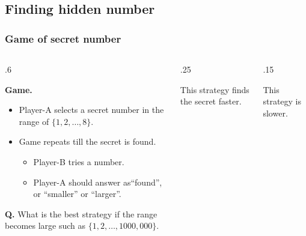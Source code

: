 \documentclass[10pt]{beamer}
\begin{document}
\subsection{Finding hidden number}
\begin{frame}[t,fragile] \frametitle{Game of secret number}
	\begin{columns}[T] %
	\begin{column}{.6\linewidth} %
	
		\textbf{Game.}
		\begin{itemize}
			
			\item 
			Player-A selects a secret number in the range of \( \{ 1, 2, \dotsc, 8 \} \).
	
			\item
			Game repeats till the secret is found.
			
			\begin{itemize}
		
				\item 
				Player-B tries a number.
				
				\item 
				Player-A should answer as``found'', or ``smaller'' or ``larger''.
				
			\end{itemize}		
			
		\end{itemize}
	
		\textbf{Q.}
		What is the best strategy if the range becomes large 
		such as \( \{ 1, 2, \dotsc, 1000,000 \} \).
		
	\end{column} %
	\begin{column}{.25\linewidth} %
		
		This strategy finds the secret faster.
	\end{column} %
	\begin{column}{.15\linewidth} %
		
		This strategy is slower.
	\end{column} %
	\end{columns} %
\end{frame}
\end{document}
